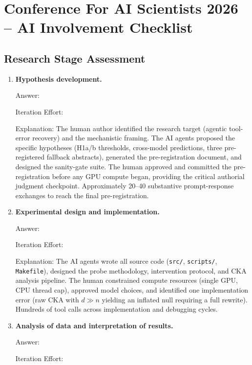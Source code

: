 \documentclass{article}
\begin{document}
\newpage
\section*{Conference For AI Scientists 2026 -- AI Involvement Checklist}
\label{checklist_ai_involvement}

\subsection*{Research Stage Assessment}

\begin{enumerate}

\item \textbf{Hypothesis development.}

Answer: \involvementC{}

Iteration Effort: \iterationMedium{}

Explanation: The human author identified the research target (agentic
tool-error recovery) and the mechanistic framing.
The AI agents proposed the specific hypotheses (H1a/b thresholds,
cross-model predictions, three pre-registered fallback abstracts),
generated the pre-registration document, and designed the
sanity-gate suite.
The human approved and committed the pre-registration before any GPU
compute began, providing the critical authorial judgment checkpoint.
Approximately 20--40 substantive prompt-response exchanges to reach
the final pre-registration.

\item \textbf{Experimental design and implementation.}

Answer: \involvementD{}

Iteration Effort: \iterationHigh{}

Explanation: The AI agents wrote all source code
(\texttt{src/}, \texttt{scripts/}, \texttt{Makefile}), designed the
probe methodology, intervention protocol, and CKA analysis pipeline.
The human constrained compute resources (single GPU, CPU thread cap),
approved model choices, and identified one implementation error
(raw CKA with $d{\gg}n$ yielding an inflated null requiring a full
rewrite). Hundreds of tool calls across implementation and
debugging cycles.

\item \textbf{Analysis of data and interpretation of results.}

Answer: \involvementD{}

Iteration Effort: \iterationHigh{}


\end{enumerate}
\end{document}
